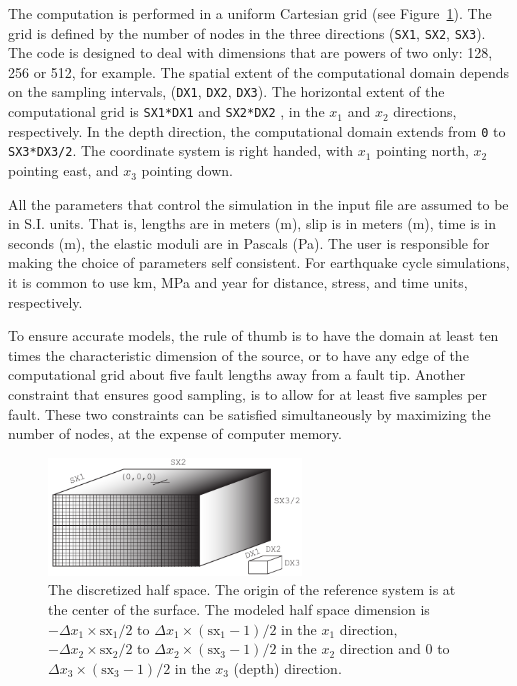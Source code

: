 \documentclass[10pt]{article}
\begin{document}
The computation is performed in a uniform Cartesian grid (see Figure~\ref{fig:computation_grid}). The grid is defined by the number of nodes in the three directions (\verb'SX1', \verb'SX2', \verb'SX3'). The code is designed to deal with dimensions that are powers of two only: 128, 256 or 512, for example. The spatial extent of the computational domain depends on the sampling intervals, (\verb'DX1', \verb'DX2', \verb'DX3'). The horizontal extent of the computational grid is \verb'SX1*DX1' and \verb'SX2*DX2' , in the $x_1$ and $x_2$ directions, respectively. In the depth direction, the computational domain extends from \verb'0' to \verb'SX3*DX3/2'. The coordinate system is right handed, with $x_1$ pointing north, $x_2$ pointing east, and $x_3$ pointing down. 

All the parameters that control the simulation in the input file are assumed to be in S.I. units. That is, lengths are in meters (m), slip is in meters (m), time is in seconds (m), the elastic moduli are in Pascals (Pa). The user is responsible for making the choice of parameters self consistent. For earthquake cycle simulations, it is common to use km, MPa and year for distance, stress, and time units, respectively.

To ensure accurate models, the rule of thumb is to have the domain at least ten times the characteristic dimension of the source, or to have any edge of the computational grid about five fault lengths away from a fault tip. Another constraint that ensures good sampling, is to allow for at least five samples per fault. These two constraints can be satisfied simultaneously by maximizing the number of nodes, at the expense of computer memory.
%
\begin{figure}[h]
\centering\includegraphics[width=0.6\textwidth]{computational_grid.pdf}
\caption{The discretized half space. The origin of the reference system is at the center of the surface. The modeled half space dimension is $-\Delta x_1\times\text{sx}_1/2$ to $\Delta x_1\times(\text{sx}_1-1)/2$ in the $x_1$ direction, $-\Delta x_2\times\text{sx}_2/2$ to $\Delta x_2\times(\text{sx}_3-1)/2$ in the $x_2$ direction and $0$ to $\Delta x_3\times(\text{sx}_3-1)/2$ in the $x_3$ (depth) direction.}
\label{fig:computation_grid}
\end{figure}
%
\end{document}
